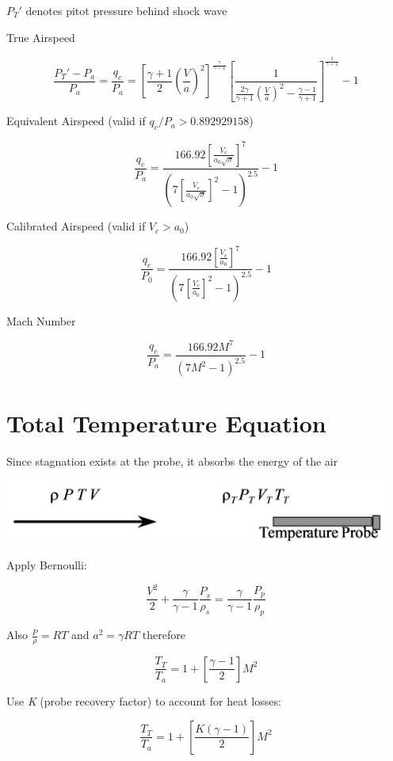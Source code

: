 \documentclass[
]{book}
\begin{document}
\(P_T'\) denotes pitot pressure behind shock wave

True Airspeed

\[ \frac{P_T' - P_a}{P_a} = \frac{q_c}{P_a} = \left[ \frac{\gamma + 1}{2} \left(  \frac{V}{a} \right)^2  \right]^\frac{\gamma}{\gamma-1} \left[ \frac{1}{ \frac{2\gamma}{\gamma+1} \left( \frac{V}{a} \right)^2 - \frac{\gamma-1}{\gamma+1} }  \right]^\frac{1}{\gamma-1} - 1 \]

Equivalent Airspeed (valid if \(q_c/P_a > 0.892 929 158\))

\[ \frac{q_c}{P_a} = \frac{166.92 \left[ \frac{V_e}{a_0 \sqrt{\sigma}} \right]^7} {\left( 7 \left[ \frac{V_e}{a_0 \sqrt{\sigma}} \right]^2 - 1 \right)^{2.5}} - 1 \]

Calibrated Airspeed (valid if \(V_c > a_0\))

\[ \frac{q_c}{P_0} = \frac{166.92 \left[ \frac{V_c}{a_0} \right]^7} {\left( 7 \left[ \frac{V_c}{a_0} \right]^2 - 1 \right)^{2.5}} - 1\]

Mach Number

\[ \frac{q_c}{P_a} = \frac{166.92 M^7} {\left( 7 M^2 - 1 \right)^{2.5}} -1 \]

\hypertarget{total-temperature-equation}{%
\section{Total Temperature Equation}\label{total-temperature-equation}}

Since stagnation exists at the probe, it absorbs the energy of the air

\includegraphics[width=5in,height=0.82in]{media/04/image13.png}

Apply Bernoulli:

\[ \frac{V^2}{2} + \frac{\gamma}{\gamma - 1}  \frac{P_s}{\rho_s} = \frac{\gamma}{\gamma - 1} \frac{P_p}{\rho_p} \]

Also \(\frac{P}{\rho} = RT\) and \(a^2 = \gamma RT\) therefore

\[ \frac{T_T}{T_a} = 1 + \left[ \frac{\gamma - 1}{2} \right] M^2 \]

Use \emph{K} (probe recovery factor) to account for heat losses:

\[ \frac{T_T}{T_a} = 1 + \left[ \frac{K(\gamma - 1)}{2} \right] M^2 \]
\end{document}
